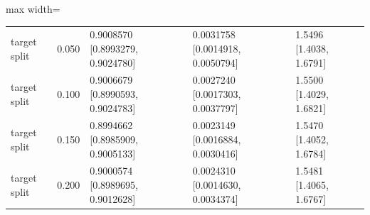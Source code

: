 \begin{table}[!tbp]
\begin{adjustbox}{max width=\textwidth}
\begin{tabular}{@{}lllll@{}}
target split & 0.050 & 0.9008570 [0.8993279, 0.9024780] & 0.0031758 [0.0014918, 0.0050794] & 1.5496 [1.4038, 1.6791] \\
target split & 0.100 & 0.9006679 [0.8990593, 0.9024783] & 0.0027240 [0.0017303, 0.0037797] & 1.5500 [1.4029, 1.6821] \\
target split & 0.150 & 0.8994662 [0.8985909, 0.9005133] & 0.0023149 [0.0016884, 0.0030416] & 1.5470 [1.4052, 1.6784] \\
target split & 0.200 & 0.9000574 [0.8989695, 0.9012628] & 0.0024310 [0.0014630, 0.0034374] & 1.5481 [1.4065, 1.6767] \\
\bottomrule
\end{tabular}
\end{adjustbox}
\end{table}

